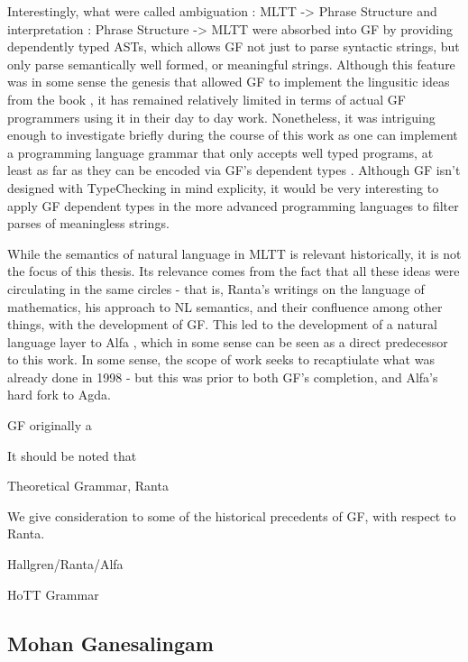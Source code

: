Interestingly, what were called ambiguation : MLTT -> {Phrase Structure} and
interpretation : {Phrase Structure} -> MLTT were absorbed into GF by providing
dependently typed ASTs, which allows GF not just to parse syntactic strings, but
only parse semantically well formed, or meaningful strings. Although this
feature was in some sense the genesis that allowed GF to implement the
lingusitic ideas from the book \cite{rantaTT}, it has remained relatively
limited in terms of actual GF programmers using it in their day to day work.
Nonetheless, it was intriguing enough to investigate briefly during the course
of this work as one can implement a programming language grammar that only
accepts well typed programs, at least as far as they can be encoded via GF's
dependent types \cite{warrickHarper}. Although GF isn't designed with
TypeChecking in mind explicity, it would be very interesting to apply GF
dependent types in the more advanced programming languages to filter parses of
meaningless strings.

While the semantics of natural language in MLTT is relevant historically, it is
not the focus of this thesis. Its relevance comes from the fact that all these
ideas were circulating in the same circles - that is, Ranta's writings on the
language of mathematics, his approach to NL semantics, and their confluence
among other things, with the development of GF. This led to the development of a
natural language layer to Alfa \cite{alfaGF}, which in some sense can be seen as
a direct predecessor to this work. In some sense, the scope of work seeks to
recaptiulate  what was already done in 1998 - but this was prior to both GF's
completion, and Alfa's hard fork to Agda.



GF originally a





It should be noted that 


Theoretical Grammar, Ranta

We give consideration to some of the historical precedents of GF, with respect
to Ranta. 

Hallgren/Ranta/Alfa

HoTT Grammar

\subsection{Mohan Ganesalingam}

